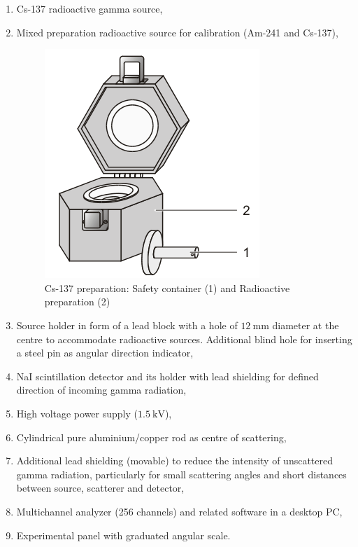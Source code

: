 \documentclass[%
 reprint,
nofootinbib,
 amsmath,amssymb,
 aps,
floatfix,
]{revtex4-2}
\begin{document}
    \begin{enumerate}
        \item Cs-137 radioactive gamma source,
        \item Mixed preparation radioactive source for calibration (Am-241 and Cs-137),
        \begin{figure}
            \centering
            \includegraphics{Figures/box.png}
            \caption{Cs-137 preparation: Safety container (1) and Radioactive preparation (2)}
            \label{fig:box}
        \end{figure}
        \item Source holder in form of a lead block with a hole of $\SI{12}{\milli \metre}$ diameter at the centre to accommodate radioactive sources. Additional blind hole for inserting a steel pin as angular direction indicator,
        \item NaI scintillation detector and its holder with lead shielding for defined direction of incoming gamma radiation,
        \item High voltage power supply ($\SI{1.5}{\kilo \volt}$),
        \item Cylindrical pure aluminium/copper rod as centre of scattering,
        \item Additional lead shielding (movable) to reduce the intensity of unscattered gamma radiation, particularly for small scattering angles and short distances between source, scatterer and detector,
        \item Multichannel analyzer (256 channels) and related software in a desktop PC,
        \item Experimental panel with graduated angular scale.
    \end{enumerate}
\end{document}
